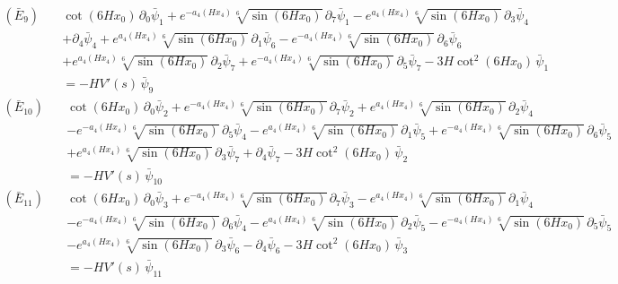 \begin{align*}
(\bar E_{9})\quad & \cot \left(6 H x_0\right)\,\partial_{0}\bar\psi_{1} + e^{-a_4\left(H x_4\right)} \sqrt[6]{\sin \left(6 H x_0\right)}\,\partial_{7}\bar\psi_{1} - e^{a_4\left(H x_4\right)} \sqrt[6]{\sin \left(6 H x_0\right)}\,\partial_{3}\bar\psi_{4} \\
 &  + \partial_{4}\bar\psi_{4} + e^{a_4\left(H x_4\right)} \sqrt[6]{\sin \left(6 H x_0\right)}\,\partial_{1}\bar\psi_{6} - e^{-a_4\left(H x_4\right)} \sqrt[6]{\sin \left(6 H x_0\right)}\,\partial_{6}\bar\psi_{6} \\
 &  + e^{a_4\left(H x_4\right)} \sqrt[6]{\sin \left(6 H x_0\right)}\,\partial_{2}\bar\psi_{7} + e^{-a_4\left(H x_4\right)} \sqrt[6]{\sin \left(6 H x_0\right)}\,\partial_{5}\bar\psi_{7} - 3 H \cot ^2\left(6 H x_0\right)\,\bar\psi_{1} \\
 & = -H V'(s)\,\bar\psi_{9}
\end{align*}
\begin{align*}
(\bar E_{10})\quad & \cot \left(6 H x_0\right)\,\partial_{0}\bar\psi_{2} + e^{-a_4\left(H x_4\right)} \sqrt[6]{\sin \left(6 H x_0\right)}\,\partial_{7}\bar\psi_{2} + e^{a_4\left(H x_4\right)} \sqrt[6]{\sin \left(6 H x_0\right)}\,\partial_{2}\bar\psi_{4} \\
 &  - e^{-a_4\left(H x_4\right)} \sqrt[6]{\sin \left(6 H x_0\right)}\,\partial_{5}\bar\psi_{4} - e^{a_4\left(H x_4\right)} \sqrt[6]{\sin \left(6 H x_0\right)}\,\partial_{1}\bar\psi_{5} + e^{-a_4\left(H x_4\right)} \sqrt[6]{\sin \left(6 H x_0\right)}\,\partial_{6}\bar\psi_{5} \\
 &  + e^{a_4\left(H x_4\right)} \sqrt[6]{\sin \left(6 H x_0\right)}\,\partial_{3}\bar\psi_{7} + \partial_{4}\bar\psi_{7} - 3 H \cot ^2\left(6 H x_0\right)\,\bar\psi_{2} \\
 & = -H V'(s)\,\bar\psi_{10}
\end{align*}
\begin{align*}
(\bar E_{11})\quad & \cot \left(6 H x_0\right)\,\partial_{0}\bar\psi_{3} + e^{-a_4\left(H x_4\right)} \sqrt[6]{\sin \left(6 H x_0\right)}\,\partial_{7}\bar\psi_{3} - e^{a_4\left(H x_4\right)} \sqrt[6]{\sin \left(6 H x_0\right)}\,\partial_{1}\bar\psi_{4} \\
 &  - e^{-a_4\left(H x_4\right)} \sqrt[6]{\sin \left(6 H x_0\right)}\,\partial_{6}\bar\psi_{4} - e^{a_4\left(H x_4\right)} \sqrt[6]{\sin \left(6 H x_0\right)}\,\partial_{2}\bar\psi_{5} - e^{-a_4\left(H x_4\right)} \sqrt[6]{\sin \left(6 H x_0\right)}\,\partial_{5}\bar\psi_{5} \\
 &  - e^{a_4\left(H x_4\right)} \sqrt[6]{\sin \left(6 H x_0\right)}\,\partial_{3}\bar\psi_{6} - \partial_{4}\bar\psi_{6} - 3 H \cot ^2\left(6 H x_0\right)\,\bar\psi_{3} \\
 & = -H V'(s)\,\bar\psi_{11}
\end{align*}
